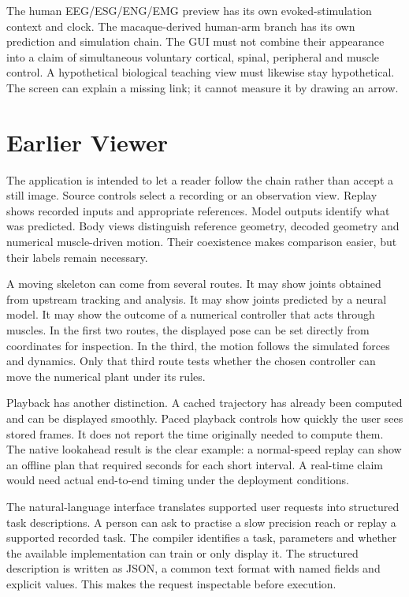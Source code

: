 The human EEG/ESG/ENG/EMG preview has its own evoked-stimulation context and clock.
The macaque-derived human-arm branch has its own prediction and simulation
chain. The GUI must not combine their appearance into a claim of simultaneous
voluntary cortical, spinal, peripheral and muscle control. A hypothetical
biological teaching view must likewise stay hypothetical. The screen can
explain a missing link; it cannot measure it by drawing an arrow.


\section{Earlier Viewer}

The application is intended to let a reader follow the chain rather than accept a still image. Source controls select a recording or an observation view. Replay shows recorded inputs and appropriate references. Model outputs identify what was predicted. Body views distinguish reference geometry, decoded geometry and numerical muscle-driven motion. Their coexistence makes comparison easier, but their labels remain necessary.

A moving skeleton can come from several routes. It may show joints obtained from upstream tracking and analysis. It may show joints predicted by a neural model. It may show the outcome of a numerical controller that acts through muscles. In the first two routes, the displayed pose can be set directly from coordinates for inspection. In the third, the motion follows the simulated forces and dynamics. Only that third route tests whether the chosen controller can move the numerical plant under its rules.

Playback has another distinction. A cached trajectory has already been computed and can be displayed smoothly. Paced playback controls how quickly the user sees stored frames. It does not report the time originally needed to compute them. The native lookahead result is the clear example: a normal-speed replay can show an offline plan that required seconds for each short interval. A real-time claim would need actual end-to-end timing under the deployment conditions.

The natural-language interface translates supported user requests into structured task descriptions. A person can ask to practise a slow precision reach or replay a supported recorded task. The compiler identifies a task, parameters and whether the available implementation can train or only display it. The structured description is written as JSON, a common text format with named fields and explicit values. This makes the request inspectable before execution.

